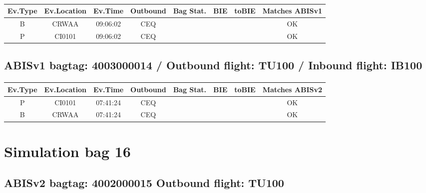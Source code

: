 \documentclass{report}
\begin{document}
\paragraph{}
\begin{longtable}{cccccccc}    \toprule
\rowcolor{white!50}
\textbf{Ev.Type} & \textbf{Ev.Location} & \textbf{Ev.Time} & \textbf{Outbound} & \textbf{Bag Stat.} & \textbf{BIE} & \textbf{toBIE} & \textbf{Matches ABISv1} \\\midrule
B & CRWAA & 09:06:02  & CEQ &  &  &  & OK\\
P & CI0101 & 09:06:02  & CEQ &  &  &  & OK\\
\bottomrule
\end{longtable}
\subsection*{ABISv1 bagtag: 4003000014 / Outbound flight: TU100 / Inbound flight: IB100}
\paragraph{}
\begin{longtable}{cccccccc}    \toprule
\rowcolor{white!50}
\textbf{Ev.Type} & \textbf{Ev.Location} & \textbf{Ev.Time} & \textbf{Outbound} & \textbf{Bag Stat.} & \textbf{BIE} & \textbf{toBIE} & \textbf{Matches ABISv2} \\\midrule
P & CI0101 & 07:41:24  & CEQ &  &  &  & OK\\
B & CRWAA & 07:41:24  & CEQ &  &  &  & OK\\
\bottomrule
\end{longtable}
\pagebreak
\section*{Simulation bag 16}
\subsection*{ABISv2 bagtag: 4002000015 Outbound flight: TU100}
\end{document}

